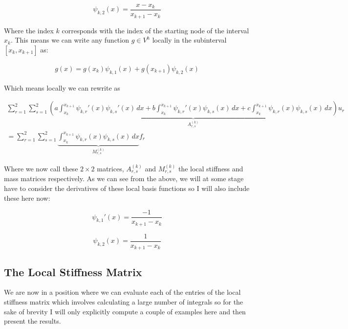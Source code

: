 \begin{equation}
    \psi_{k,2}(x) = \frac{x - x_k}{x_{k+1} - x_k}
\end{equation}

Where the index $k$ corresponds with the index of the starting node of the
interval $x_k$.  This means we can write any function $g \in V^h$ locally in
the subinterval $[x_k, x_{k+1}]$ as:

\begin{align*}
    g(x) = g(x_k)\psi_{k,1}(x) + g(x_{k+1})\psi_{k,2}(x)
\end{align*}

Which means locally we can rewrite  as

\begin{equation}\label{eq:oned-deterministic-local-discrete}
  \begin{split}
    \sum_{r = 1}^2\sum_{s = 1}^2\underbrace{\left(
          a\int_{x_k}^{x_{k+1}}\psi_{k,r}'(x)\psi_{k,s}'(x)\, dx
        + b\int_{x_k}^{x_{k+1}}\psi_{k,r}'(x)\psi_{k,s}(x)\, dx
        + c\int_{x_k}^{x_{k+1}}\psi_{k,r}(x)\psi_{k,s}(x)\, dx
    \right)}_{A^{(k)}_{r,s}}u_r  \\
    = \sum_{r= 1}^2\sum_{s = 1}^2\underbrace{
            \int_{x_k}^{x_{k+1}}{\psi_{k,r}(x)\psi_{k,s}(x)}\, dx}_{M^{(k)}_{r,s}}f_r
  \end{split}
\end{equation}

Where we now call these $2 \times 2$ matrices, $A^{(k)}_{r,s}$ and
$M^{(k)}_{r,s}$ the local stiffness and mass matrices respectively. As we can
see from the above, we will at some stage have to consider the derivatives of
these local basis functions so I will also include these here now:

\begin{equation}
    \psi_{k,1}'(x) = \frac{-1}{x_{k+1} - x_{k}}
\end{equation}

\begin{equation}
    \psi_{k,2}(x) = \frac{1}{x_{k+1} - x_{k}}
\end{equation}

\subsection{The Local Stiffness Matrix}

We are now in a position where we can evaluate each of the entries of the local
stiffness matrix which involves calculating a large number of integrals so for
the sake of brevity I will only explicitly compute a couple of examples here
and then present the results.

